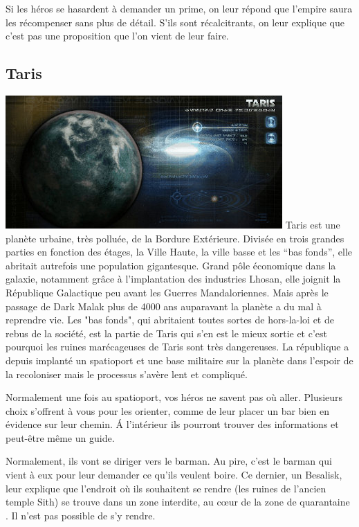 Si les héros se hasardent à demander un prime, on leur répond que l’empire saura les récompenser sans plus de détail. S’ils sont récalcitrants, on leur explique que c’est pas une proposition que l’on vient de leur faire.


\subsection{Taris} \label{sec:taris}
\noindent\includegraphics[width=\linewidth]{_img/places/taris.jpg}
Taris est une planète urbaine, très polluée, de la Bordure Extérieure. Divisée en trois grandes parties en fonction des étages, la Ville Haute, la ville basse et les “bas fonds”, elle abritait autrefois une population gigantesque. Grand pôle économique dans la galaxie, notamment grâce à l’implantation des industries Lhosan, elle joignit la République Galactique peu avant les Guerres Mandaloriennes. Mais après le passage de Dark Malak plus de 4000 ans auparavant la planète a du mal à reprendre vie. Les "bas fonds", qui abritaient toutes sortes de hors-la-loi et de rebus de la société, est la partie de Taris qui s’en est le mieux sortie et c’est pourquoi les ruines marécageuses de Taris sont très dangereuses. La république a depuis implanté un spatioport et une base militaire sur la planète dans l’espoir de la recoloniser mais le processus s’avère lent et compliqué.

Normalement une fois au spatioport, vos héros ne savent pas où aller. Plusieurs choix s’offrent à vous pour les orienter, comme de leur placer un bar bien en évidence sur leur chemin. \'A l’intérieur ils pourront trouver des informations et peut-être même un guide.

Normalement, ils vont se diriger vers le barman. Au pire, c’est le barman qui vient à eux pour leur demander ce qu’ils veulent boire. Ce dernier, un Besalisk, leur explique que l’endroit où ils souhaitent se rendre (les ruines de l’ancien temple Sith) se trouve dans un zone interdite, au c\oe{ur} de la zone de quarantaine . Il n’est pas possible de s’y rendre.

